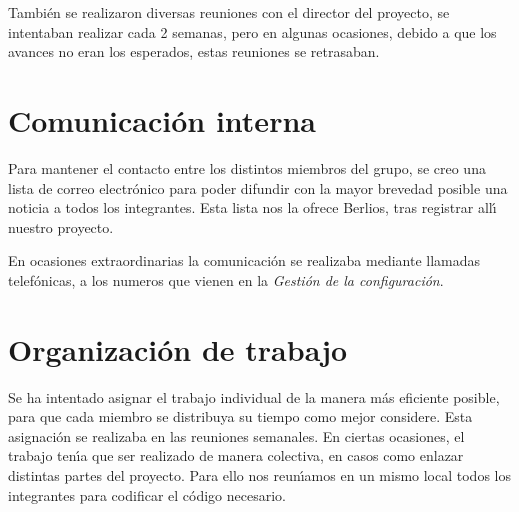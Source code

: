 Tambi\'en se realizaron diversas reuniones con el director del proyecto, se intentaban realizar cada 2 semanas, pero en algunas ocasiones, debido a que los avances no eran los esperados, estas reuniones se retrasaban.

\section{Comunicaci\'on interna}

Para mantener el contacto entre los distintos miembros del grupo, se creo una lista de correo electr\'onico para poder difundir con la mayor brevedad posible una noticia a todos los integrantes. Esta lista nos la ofrece Berlios, tras registrar all\'\i ~ nuestro proyecto.

En ocasiones extraordinarias la comunicaci\'on se realizaba mediante llamadas telef\'onicas, a los numeros que vienen en la \emph{Gesti\'on de la configuraci\'on}.

\section{Organizaci\'on de trabajo}

Se ha intentado asignar el trabajo individual de la manera m\'as eficiente posible, para que cada miembro se distribuya su tiempo como mejor considere. Esta asignaci\'on se realizaba en las reuniones semanales.
En ciertas ocasiones, el trabajo ten\'\i a que ser realizado de manera colectiva, en casos como enlazar distintas partes del proyecto. Para ello nos reun\'\i amos en un mismo local todos los integrantes para codificar el c\'odigo necesario.
